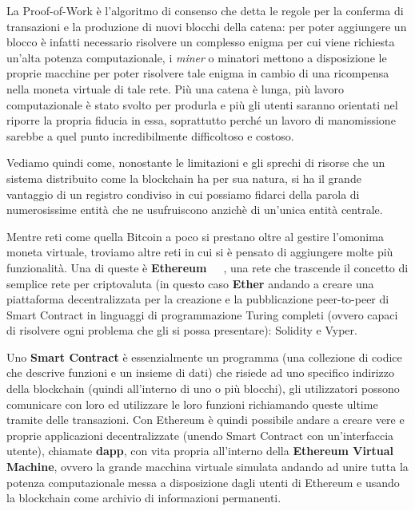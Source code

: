 La Proof-of-Work è l'algoritmo di consenso che detta le regole per 
la conferma di transazioni e la produzione di nuovi blocchi della catena: 
per poter aggiungere un blocco è infatti necessario risolvere un complesso 
enigma per cui viene richiesta un'alta potenza computazionale, i \emph{miner} 
o minatori mettono a disposizione le proprie macchine per poter risolvere tale 
enigma in cambio di una ricompensa nella moneta virtuale di tale rete.
Più una catena è lunga, più lavoro computazionale è stato svolto per produrla e 
più gli utenti saranno orientati nel riporre la propria fiducia in essa, soprattutto 
perché un lavoro di manomissione sarebbe a quel punto incredibilmente difficoltoso e costoso.

Vediamo quindi come, nonostante le limitazioni e gli sprechi di risorse che un sistema 
distribuito come la blockchain ha per sua natura, si ha il grande vantaggio 
di un registro condiviso in cui possiamo fidarci della parola di numerosissime 
entità che ne usufruiscono anzichè di un'unica entità centrale.

\label{sub:eth}
Mentre reti come quella Bitcoin a poco si prestano oltre al gestire l'omonima moneta virtuale, 
troviamo altre reti in cui si è pensato di aggiungere molte più funzionalità.
Una di queste è \textbf{Ethereum}~\cite{ethorg-wp-21}~\cite{eth-21}~\cite{eth-22}, una rete che trascende il concetto di semplice rete 
per criptovaluta (in questo caso \textbf{Ether} andando a creare una piattaforma 
decentralizzata per la creazione e la pubblicazione peer-to-peer di Smart Contract 
in linguaggi di programmazione Turing completi (ovvero capaci di risolvere ogni problema 
che gli si possa presentare): Solidity e Vyper. 

Uno \textbf{Smart Contract} è essenzialmente un programma (una collezione di codice che descrive 
funzioni e un insieme di dati) che risiede ad uno specifico indirizzo della blockchain 
(quindi all'interno di uno o più blocchi), gli utilizzatori possono comunicare con loro 
ed utilizzare le loro funzioni richiamando queste ultime tramite delle transazioni. 
Con Ethereum è quindi possibile andare a creare vere e proprie applicazioni decentralizzate
(unendo Smart Contract con un'interfaccia utente), chiamate \textbf{dapp},
con vita propria all'interno della \textbf{Ethereum Virtual Machine}, ovvero
la grande macchina virtuale simulata andando ad unire tutta la potenza computazionale
messa a disposizione dagli utenti di Ethereum e usando la blockchain come archivio
di informazioni permanenti. 

